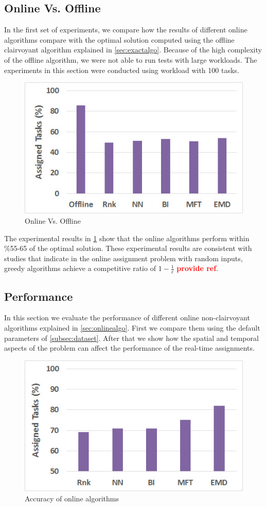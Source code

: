 \subsection{Online Vs. Offline}
In the first set of experiments, we compare how the results of different online algorithms compare with the optimal solution computed using the offline clairvoyant algorithm explained in \cref{sec:exactalgo}. Because of the high complexity of the offline algorithm, we were not able to run tests with large workloads. The experiments in this section were conducted using workload with 100 tasks.

\begin{figure}[h]
	\centering
	\includegraphics[width = 0.6\columnwidth]{figures/off_vs_on.jpg}
	\vspace{-0.1in}
	\caption{Online Vs. Offline}\label{fig:off_vs_on}
\end{figure}

The experimental results in \cref{fig:off_vs_on} show that the online algorithms perform within \%55-65 of the optimal solution. These experimental results are consistent with studies that indicate in the online assignment problem with random inputs, greedy algorithms achieve a competitive ratio of $1 - \frac{1}{e}$ \textcolor{red}{\textbf{provide ref}}.

\subsection{Performance}
In this section we evaluate the performance of different online non-clairvoyant algorithms explained in \cref{sec:onlinealgo}. First we compare them using the default parameters of \cref{subsec:dataset}. After that we show how the spatial and temporal aspects of the problem can affect the performance of the real-time assignments.

\begin{figure}[h]
	\centering
	\includegraphics[width = 0.6\columnwidth]{figures/accuracy.jpg}
	\vspace{-0.1in}
	\caption{Accuracy of online algorithms}\label{fig:accuracy}
\end{figure}

